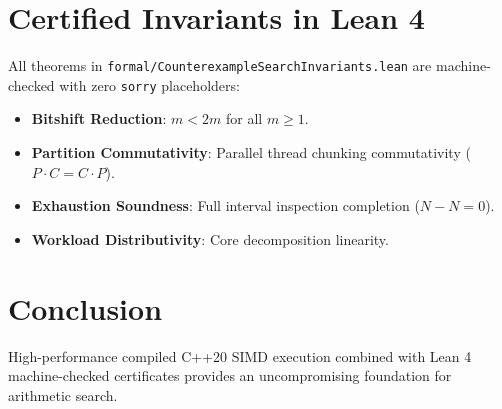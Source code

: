 \documentclass[10pt,twocolumn,letterpaper]{article}
\begin{document}
\section{Certified Invariants in Lean 4}
All theorems in \texttt{formal/CounterexampleSearchInvariants.lean} are machine-checked with zero \texttt{sorry} placeholders:
\begin{itemize}
    \item \textbf{Bitshift Reduction}: $m < 2m$ for all $m \ge 1$.
    \item \textbf{Partition Commutativity}: Parallel thread chunking commutativity ($P \cdot C = C \cdot P$).
    \item \textbf{Exhaustion Soundness}: Full interval inspection completion ($N - N = 0$).
    \item \textbf{Workload Distributivity}: Core decomposition linearity.
\end{itemize}

\section{Conclusion}
High-performance compiled C++20 SIMD execution combined with Lean 4 machine-checked certificates provides an uncompromising foundation for arithmetic search.
\end{document}
